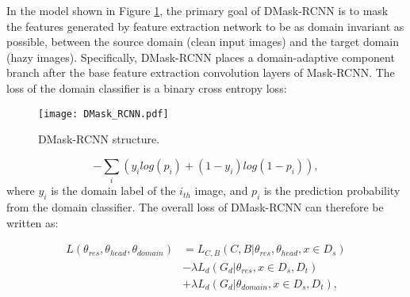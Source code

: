\documentclass[10pt,twocolumn,letterpaper]{article}
\begin{document}


In the model shown in Figure \ref{fig:DMask}, the primary goal of DMask-RCNN is to mask the features generated by feature extraction network to be as domain invariant as possible, between the source domain (clean input images) and the target domain (hazy images). Specifically, DMask-RCNN places a domain-adaptive component branch after the base feature extraction convolution layers of Mask-RCNN. The loss of the domain classifier is a binary cross entropy loss:

\begin{figure}[h]
\centering
\texttt{[image: DMask\_RCNN.pdf]}
\caption{DMask-RCNN structure.}
\label{fig:DMask}
\end{figure}



\begin{equation}
-\sum_{i} (y_{i}log(p_i)+(1-y_i)log(1-p_i)),
\end{equation}
\noindent where $y_i$ is the domain label of the $i_{th}$ image, and $p_i$ is the prediction probability from the domain classifier. The overall loss of DMask-RCNN can therefore be written as:

\begin{equation}
\label{total loss}
\begin{split}
L(\theta_{res}, \theta_{head}, \theta_{domain}) & = L_{C,B}(C,B| \theta_{res}, \theta_{head}, x \in D_s )\\
& - \lambda L_d(G_d| \theta_{res}, x\in D_s, D_t) \\
& + \lambda L_d(G_d| \theta_{domain}, x\in D_s, D_t),
\end{split}
\end{equation}
\end{document}
